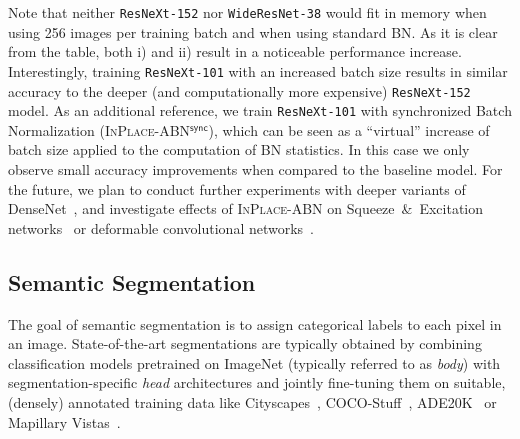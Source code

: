 \documentclass[10pt,twocolumn,letterpaper]{article}
\newcommand{\bnInplace}{\textsc{InPlace-ABN}\xspace}
\newcommand{\bnInplaceSync}{\textsc{InPlace-ABN$^{\mathsf{sync}}$}\xspace}
\begin{document}
Note that neither \texttt{ResNeXt-152} nor \texttt{WideResNet-38} would fit in memory when using 256 images per training batch and when using standard \textsc{BN}.
As it is clear from the table, both i) and ii) result in a noticeable performance increase.
Interestingly, training \texttt{ResNeXt-101} with an increased batch size results in similar accuracy to the deeper (and computationally more expensive) \texttt{ResNeXt-152} model.
As an additional reference, we train \texttt{ResNeXt-101} with synchronized Batch Normalization (\bnInplaceSync), which can be seen as a ``virtual'' increase of batch size applied to the computation of \textsc{BN} statistics.
In this case we only observe small accuracy improvements when compared to the baseline model.
For the future, we plan to conduct further experiments with deeper variants of DenseNet~\cite{Huang2017}, and investigate effects of \bnInplace on Squeeze~\&~Excitation networks~\cite{Hu2017} or deformable convolutional networks~\cite{Dai+17}.




\subsection{Semantic Segmentation}\label{ssec:ExpSegm}
The goal of semantic segmentation is to assign categorical labels to each pixel in an image. State-of-the-art segmentations are typically obtained by combining classification models pretrained on ImageNet (typically referred to as \textit{body}) with segmentation-specific \textit{head} architectures and jointly fine-tuning them on suitable, (densely) annotated training data like Cityscapes~\cite{Cordts2016}, COCO-Stuff~\cite{Caesar2016}, ADE20K~\cite{Zho+16} or Mapillary Vistas~\cite{Neuhold2017}. 
\end{document}
